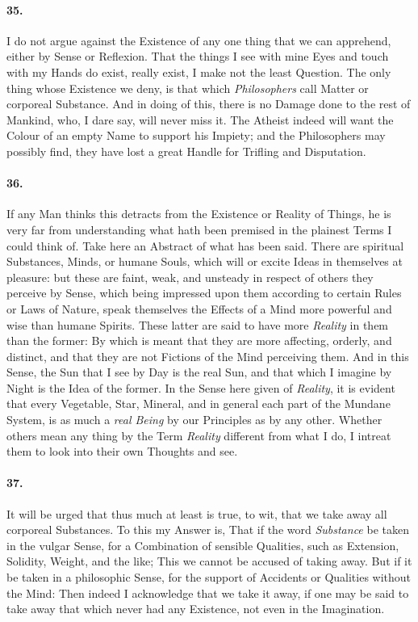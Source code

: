 \documentclass[]{article}
\newenvironment{sectionbody}{}{}
\begin{document}
\begin{sectionbody}
\paragraph{35.} I do not argue against the Existence of any one thing that we can
apprehend, either by Sense or Reflexion.  That the things I see
with mine Eyes and touch with my Hands do exist, really exist, I
make not the least Question.  The only thing whose Existence we
deny, is that which \emph{Philosophers} call Matter or
corporeal Substance.  And in doing of this, there is no Damage
done to the rest of Mankind, who, I dare say, will never miss it.
The Atheist indeed will want the Colour of an empty Name to
support his Impiety; and the Philosophers may possibly find, they
have lost a great Handle for Trifling and Disputation.



\paragraph{36.} If any Man thinks this detracts from the Existence or Reality of
Things, he is very far from understanding what hath been premised
in the plainest Terms I could think of.  Take here an Abstract of
what has been said.  There are spiritual Substances, Minds, or
humane Souls, which will or excite Ideas in themselves at
pleasure: but these are faint, weak, and unsteady in respect of
others they perceive by Sense,  which being impressed upon them
according to certain Rules or Laws of Nature, speak themselves
the Effects of a Mind more powerful and wise than humane Spirits.
These latter are said to have more \emph{Reality} in them than
the former: By which is meant that they are more affecting,
orderly, and distinct, and that they are not Fictions of the Mind
perceiving them.  And in this Sense, the Sun that I see by Day is
the real Sun, and that which I imagine by Night is the Idea of
the former.  In the Sense here given of \emph{Reality}, it is
evident that every Vegetable, Star, Mineral, and in general each
part of the Mundane System, is as much a \emph{real Being} by
our Principles as by any other.  Whether others mean any thing by
the Term \emph{Reality} different from what I do, I intreat
them to look into their own Thoughts and see.



\paragraph{37.} It will be urged that thus much at least is true, to wit, that we
take away all corporeal Substances.  To this my Answer is, That
if the word \emph{Substance} be taken in the vulgar Sense, for
a Combination of sensible Qualities, such as Extension, Solidity,
Weight, and the like; This we cannot be accused of taking away.
But if it be taken in a philosophic Sense, for the support of
Accidents or Qualities without the Mind: Then indeed I
acknowledge that we take it away, if one may be said to take away
that which never had any Existence, not even in the Imagination.




\end{sectionbody}
\end{document}
